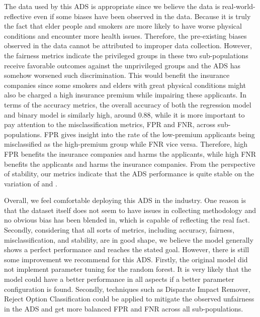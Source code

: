\documentclass[10pt]{article}
\newcommand{\code}[1]{{\color{black}{\texttt{#1}}}} %
\begin{document}

The data used by this ADS is appropriate since we believe the data is real-world-reflective even if some biases have been observed in the data. Because it is truly the fact that elder people and smokers are more likely to have worse physical conditions and encounter more health issues. Therefore, the pre-existing biases observed in the data cannot be attributed to improper data collection. However, the fairness metrics indicate the privileged groups in these two sub-populations receive favorable outcomes against the unprivileged groups and the ADS has somehow worsened such discrimination. This would benefit the insurance companies since some smokers and elders with great physical conditions might also be charged a high insurance premium while impairing these applicants. In terms of the accuracy metrics, the overall accuracy of both the regression model and binary model is similarly high, around 0.88, while it is more important to pay attention to the misclassification metrics, FPR and FNR, across sub-populations. FPR gives insight into the rate of the low-premium applicants being misclassified as the high-premium group while FNR vice versa. Therefore, high FPR benefits the insurance companies and harms the applicants, while high FNR benefits the applicants and harms the insurance companies. From the perspective of stability, our metrics indicate that the ADS performance is quite stable on the variation of \code{age} and \code{bmi}.

Overall, we feel comfortable deploying this ADS in the industry. One reason is that the dataset itself does not seem to have issues in collecting methodology and no obvious bias has been blended in, which is capable of reflecting the real fact. Secondly, considering that all sorts of metrics, including accuracy, fairness, misclassification, and stability, are in good shape, we believe the model generally shows a perfect performance and reaches the stated goal. However, there is still some improvement we recommend for this ADS. Firstly, the original model did not implement parameter tuning for the random forest. It is very likely that the model could have a better performance in all aspects if a better parameter configuration is found. Secondly, techniques such as Disparate Impact Remover, Reject Option Classification could be applied to mitigate the observed unfairness in the ADS and get more balanced FPR and FNR across all sub-populations.
\end{document}
